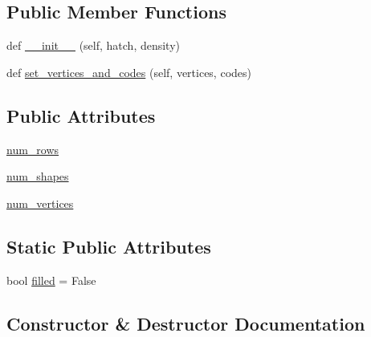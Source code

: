 \subsection*{Public Member Functions}
\begin{DoxyCompactItemize}
\item 
def \hyperlink{classmatplotlib_1_1hatch_1_1Shapes_a7e90efa5b42ca6d9a733ff8e71d78894}{\+\_\+\+\_\+init\+\_\+\+\_\+} (self, hatch, density)
\item 
def \hyperlink{classmatplotlib_1_1hatch_1_1Shapes_aa7f74fd83e2ed972b5c5e17c33d9a258}{set\+\_\+vertices\+\_\+and\+\_\+codes} (self, vertices, codes)
\end{DoxyCompactItemize}
\subsection*{Public Attributes}
\begin{DoxyCompactItemize}
\item 
\hyperlink{classmatplotlib_1_1hatch_1_1Shapes_a18cb16e7f017eca4523e61c811a36318}{num\+\_\+rows}
\item 
\hyperlink{classmatplotlib_1_1hatch_1_1Shapes_ab6dddcb2cb2f9b26de578be0522373fc}{num\+\_\+shapes}
\item 
\hyperlink{classmatplotlib_1_1hatch_1_1Shapes_ac57abf6058210aa68619520cb2691e86}{num\+\_\+vertices}
\end{DoxyCompactItemize}
\subsection*{Static Public Attributes}
\begin{DoxyCompactItemize}
\item 
bool \hyperlink{classmatplotlib_1_1hatch_1_1Shapes_aa5109c19c49124c35178cd01308d9fba}{filled} = False
\end{DoxyCompactItemize}


\subsection{Constructor \& Destructor Documentation}
\mbox{\label{classmatplotlib_1_1hatch_1_1Shapes_a7e90efa5b42ca6d9a733ff8e71d78894}} 
